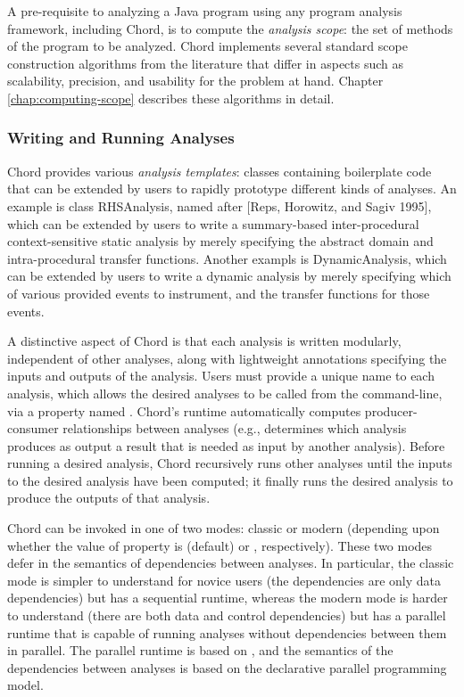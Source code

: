 A pre-requisite to analyzing a Java program using any program analysis framework, including Chord, is
to compute the {\it analysis scope}: the set of methods of the program to be analyzed.  Chord implements
several standard scope construction algorithms from the literature that differ in aspects such as
scalability, precision, and usability for the problem at hand.  Chapter \ref{chap:computing-scope}
describes these algorithms in detail.

\subsubsection*{Writing and Running Analyses}

Chord provides various {\it analysis templates}: classes containing boilerplate code that can be
extended by users to rapidly prototype different kinds of analyses.  An example is class RHSAnalysis,
named after [Reps, Horowitz, and Sagiv 1995], which can be extended by users to write a summary-based inter-procedural
context-sensitive static analysis by merely specifying the abstract domain and intra-procedural transfer functions.
Another exampls is DynamicAnalysis, which can be extended by
users to write a dynamic analysis by merely specifying which of various provided events to instrument, and
the transfer functions for those events.

A distinctive aspect of Chord is that each analysis is written modularly, independent of other analyses, along with lightweight
annotations specifying the inputs and outputs of the analysis.
Users must provide a unique name to each analysis, which allows the desired analyses to be called from the
command-line, via a property named .
Chord's runtime automatically computes
producer-consumer relationships between analyses (e.g., determines which analysis produces as output a
result that is needed as input by another analysis).  Before running a desired analysis,
Chord recursively runs other analyses until the inputs to the desired analysis have been computed; it
finally runs the desired analysis to produce the outputs of that analysis.

Chord can be invoked in one of two modes: classic or modern (depending upon whether the value of property
 is  (default) or , respectively).
These two modes defer in the semantics of dependencies between analyses.  In particular, the classic mode
is simpler to understand for novice users (the dependencies are only data dependencies) but has a sequential
runtime, whereas the modern mode is harder to understand (there are both data and control dependencies)
but has a parallel runtime that is capable of running analyses without dependencies between
them in parallel.  The parallel runtime is based on ,
and the semantics of the dependencies between analyses is based on the
 declarative parallel
programming model.

